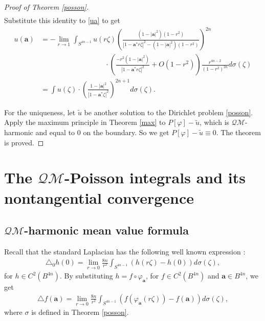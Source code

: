 \documentclass[a4paper,11pt]{amsart}
\numberwithin{equation}{section}
\begin{document}
\begin{proof}[Proof of Theorem \ref{posson}]
\begin{align*}
\end{align*}
Substitute this identity to \eqref{ua} to get
\begin{equation}\begin{aligned}\label{poisson ua}
u(\mathbf{a})
&= -\lim_{r \to 1} \int_{S^{4n-1}}u(r\zeta) \left( \frac{(1 - |\mathbf{a}|^2)(1 - r^2)}{|1 - \mathbf{a}^* r\zeta |^2 - (1 - |\mathbf{a}|^2)(1 - r^2)} \right)^{2n} \\
&\qquad\qquad\qquad\qquad\quad \cdot  \left( \frac{-r^2(1 - |\mathbf{a}|^2)}{|1 - \mathbf{a}^* r\zeta |^2}+O(1 - r^2) \right)\frac{r^{4n-2}}{(1 - r^2)^{2n}} d\sigma(\zeta) \\
&= \int u(\zeta) \cdot \left( \frac{1 - |\mathbf{a}|^2}{|1-\mathbf{a}^*\zeta|^2} \right)^{2n+1} d\sigma(\zeta).
\end{aligned}\end{equation}

For the uniqueness, let $\widetilde{u}$ be another solution to the Dirichlet problem \eqref{posson}. Apply the maximum principle in Theorem \ref{max} to $P[\varphi]-\widetilde{u}$, which is $\mathcal{QM}$-harmonic and equal to $0$ on the boundary. So we get $P[\varphi]-\widetilde{u}\equiv0$. The theorem is proved.
\end{proof}



\section{The $\mathcal{QM}$-Poisson integrals and its nontangential convergence}
\subsection{$\mathcal{QM}$-harmonic mean value formula}
Recall that the standard Laplacian has the following well known expression \cite[theorem 4.1.3]{Rudin}:
\begin{equation*}\begin{aligned}
\triangle_0 h(0)=\lim_{r\rightarrow 0}\frac{8n}{r^2}\int_{S^{4n-1}}\left(h(r\zeta)-h(0)\right)d\sigma(\zeta),
\end{aligned}\end{equation*}
for $h\in C^2(B^{4n})$. By substituting $h=f\circ\varphi_{\mathbf{a}}$, for $f\in C^2(B^{4n})$ and $\mathbf{a}\in B^{4n}$, we get
\begin{equation*}\begin{aligned}\label{inter mean v}
\triangle f(\mathbf{a})=\lim_{r\rightarrow 0}\frac{8n}{r^2}\int_{S^{4n-1}}\left(f(\varphi_{\mathbf{a}}(r\zeta))-f(\mathbf{a})\right)d\sigma(\zeta),
\end{aligned}\end{equation*}
where $\sigma$ is defined in Theorem \ref{posson}.
\end{document}
